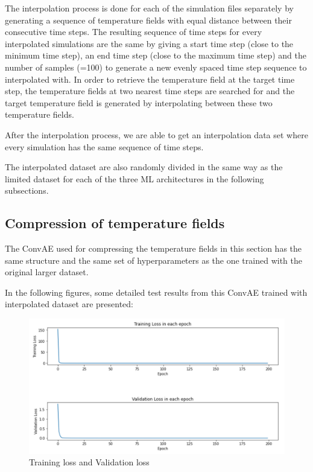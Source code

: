 The interpolation process is done for each of the simulation files separately by generating a sequence of temperature fields with equal distance between their consecutive time steps. The resulting sequence of time steps for every interpolated simulations are the same by giving a start time step (close to the minimum time step), an end time step (close to the maximum time step) and the number of samples (=100) to generate a new evenly spaced time step sequence to interpolated with. In order to retrieve the temperature field at the target time step, the temperature fields at two nearest time steps are searched for  and the target temperature field is generated by interpolating between these two temperature fields.

After the interpolation process, we are able to get an interpolation data set where every simulation has the same sequence of time steps.

The interpolated dataset are also randomly divided in the same way as the limited dataset for each of the three ML architectures in the following subsections.


\subsection{Compression of temperature fields}

The ConvAE used for compressing the temperature fields in this section has the same structure and the same set of hyperparameters as the one trained with the original larger dataset.

In the following figures, some detailed test results from this ConvAE trained with interpolated dataset are presented:

\begin{figure}[H]
    \caption{Training loss and Validation loss}
    \includegraphics[scale=0.6]{figures/mantle_convection_images/larger_dataset_interpolated/ConvAE_trainingData.png}
\end{figure}

